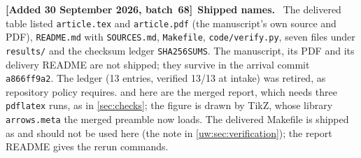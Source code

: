 \documentclass[11pt,letterpaper]{article}
\numberwithin{equation}{section}
\theoremstyle{definition}
\theoremstyle{remark}
\theoremstyle{definition}
\newenvironment{writenotee}[1][]{\par\smallskip\begingroup\small\sloppy
 \noindent\textbf{[Added 30 September 2026, batch~68]}\if\relax\detokenize{#1}\relax\else~\textbf{#1.}\fi\ }%
 {\par\endgroup\smallskip}
\begin{document}
\begin{writenotee}[Shipped names]
The delivered table listed \texttt{article.tex} and \texttt{article.pdf}
(the manuscript's own source and PDF), \texttt{README.md} with
\texttt{SOURCES.md}, \texttt{Makefile}, \texttt{code/verify.py}, seven
files under \texttt{results/} and the checksum ledger \texttt{SHA256SUMS}.
The manuscript, its PDF and its delivery README are not shipped; they
survive in the arrival commit \texttt{a866ff9a2}. The ledger (13 entries,
verified 13/13 at intake) was retired, as repository policy requires.
 and  here are the merged report, which
needs three \texttt{pdflatex} runs, as in \cref{sec:checks}; the figure is
drawn by TikZ, whose library \texttt{arrows.meta} the merged preamble now
loads. The delivered Makefile is shipped as
 and should not be used here (the
note in \cref{uw:sec:verification}); the report README gives the rerun
commands.
\end{writenotee}
\end{document}

